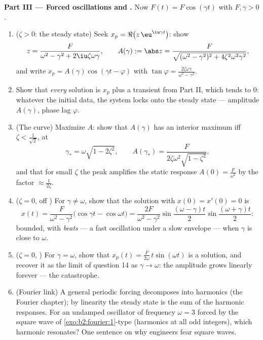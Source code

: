 \begin{problem}
\medskip
\noindent\textbf{Part III --- Forced oscillations and
.} Now $F(t) = F\cos(\gamma t)$ with $F, \gamma > 0$.
\begin{enumerate}[resume]
  \item ($\zeta > 0$: the steady state) Seek $x_p =
        \Re\bigl(z\,\eu^{\iu\gamma t}\bigr)$: show
        \[
        z = \frac{F}{\omega^2 - \gamma^2 +
        2\iu\zeta\omega\gamma},
        \qquad
        A(\gamma) := \abs z = \frac{F}{\sqrt{(\omega^2 -
        \gamma^2)^2 + 4\zeta^2\omega^2\gamma^2}} ,
        \]
        and write $x_p = A(\gamma)\cos(\gamma t - \varphi)$
        with $\tan\varphi =
        \frac{2\zeta\omega\gamma}{\omega^2-\gamma^2}$.
  \item Show that \emph{every} solution is $x_p$ plus a
        transient from Part II, which tends to $0$: whatever
        the initial data, the system locks onto the steady
        state --- amplitude $A(\gamma)$, phase lag
        $\varphi$.
  \item (The  curve) Maximize $A$: show that
        $A(\gamma)$ has an interior maximum iff $\zeta <
        \frac{1}{\sqrt2}$, at
        \[
        \gamma_* = \omega\sqrt{1 - 2\zeta^2},
        \qquad
        A(\gamma_*) =
        \frac{F}{2\zeta\omega^2\sqrt{1-\zeta^2}} ,
        \]
        and that for small $\zeta$ the peak amplifies the
        static response $A(0) = \frac F{\omega^2}$ by the
        factor $\approx \frac{1}{2\zeta}$.
  \item ($\zeta = 0$, off ) For $\gamma \neq \omega$,
        show that the solution with $x(0) = x'(0) = 0$ is
        \[
        x(t) = \frac{F}{\omega^2 -
        \gamma^2}\bigl(\cos\gamma t - \cos\omega t\bigr)
        = \frac{2F}{\omega^2-\gamma^2}
        \sin\frac{(\omega-\gamma)t}{2}
        \sin\frac{(\omega+\gamma)t}{2} :
        \]
        bounded, with \emph{beats} --- a fast oscillation
        under a slow envelope --- when $\gamma$ is close to
        $\omega$.
  \item ($\zeta = 0$, ) For $\gamma = \omega$, show
        that $x_p(t) = \frac{F}{2\omega}\,t\sin(\omega t)$ is
        a solution, and recover it as the limit of question
        14 as $\gamma \to \omega$: the amplitude grows
        linearly forever --- the  catastrophe.
  \item (Fourier link) A general periodic forcing decomposes
        into harmonics (the Fourier chapter); by linearity the
        steady state is the sum of the harmonic responses. For
        an undamped oscillator of frequency $\omega = 3$
        forced by the square wave of
        \cref{exo:b2:fourier:1}-type (harmonics at all odd
        integers), which harmonic resonates? One sentence on
        why engineers fear square waves.
\end{enumerate}


\end{problem}
